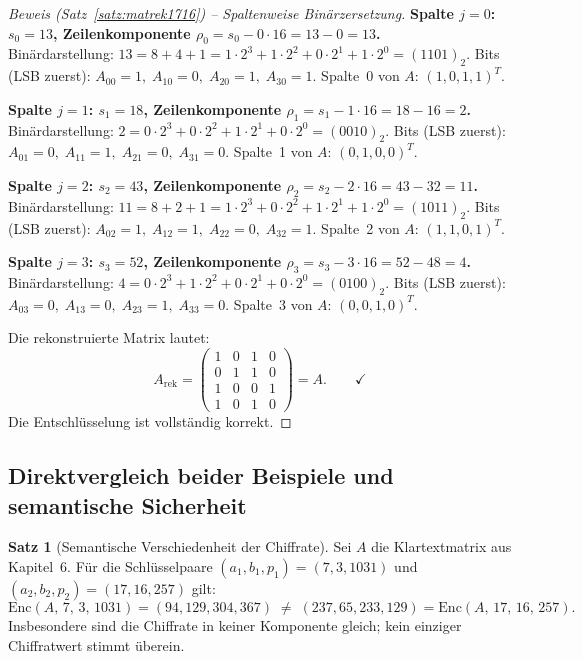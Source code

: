 ﻿\documentclass[a4paper,12pt]{scrreprt}
\theoremstyle{definition}
\newtheorem{satz}{Satz}[section]
\begin{document}
\begin{proof}[Beweis (Satz~\ref{satz:matrek1716}) -- Spaltenweise Binärzersetzung]

\medskip\noindent\textbf{Spalte $j=0$: $s_0 = 13$, Zeilenkomponente $\rho_0 = s_0 - 0 \cdot 16 = 13 - 0 = 13$.}\\
Binärdarstellung: $13 = 8 + 4 + 1 = 1 \cdot 2^3 + 1 \cdot 2^2 + 0 \cdot 2^1 + 1 \cdot 2^0 = (1101)_2$.
Bits (LSB zuerst): $A_{00}=1,\; A_{10}=0,\; A_{20}=1,\; A_{30}=1$.
Spalte~0 von $A$: $(1,0,1,1)^T$. \checkmark

\medskip\noindent\textbf{Spalte $j=1$: $s_1 = 18$, Zeilenkomponente $\rho_1 = s_1 - 1 \cdot 16 = 18 - 16 = 2$.}\\
Binärdarstellung: $2 = 0 \cdot 2^3 + 0 \cdot 2^2 + 1 \cdot 2^1 + 0 \cdot 2^0 = (0010)_2$.
Bits (LSB zuerst): $A_{01}=0,\; A_{11}=1,\; A_{21}=0,\; A_{31}=0$.
Spalte~1 von $A$: $(0,1,0,0)^T$. \checkmark

\medskip\noindent\textbf{Spalte $j=2$: $s_2 = 43$, Zeilenkomponente $\rho_2 = s_2 - 2 \cdot 16 = 43 - 32 = 11$.}\\
Binärdarstellung: $11 = 8 + 2 + 1 = 1 \cdot 2^3 + 0 \cdot 2^2 + 1 \cdot 2^1 + 1 \cdot 2^0 = (1011)_2$.
Bits (LSB zuerst): $A_{02}=1,\; A_{12}=1,\; A_{22}=0,\; A_{32}=1$.
Spalte~2 von $A$: $(1,1,0,1)^T$. \checkmark

\medskip\noindent\textbf{Spalte $j=3$: $s_3 = 52$, Zeilenkomponente $\rho_3 = s_3 - 3 \cdot 16 = 52 - 48 = 4$.}\\
Binärdarstellung: $4 = 0 \cdot 2^3 + 1 \cdot 2^2 + 0 \cdot 2^1 + 0 \cdot 2^0 = (0100)_2$.
Bits (LSB zuerst): $A_{03}=0,\; A_{13}=0,\; A_{23}=1,\; A_{33}=0$.
Spalte~3 von $A$: $(0,0,1,0)^T$. \checkmark

Die rekonstruierte Matrix lautet:
\[
A_{\mathrm{rek}} = \begin{pmatrix} 1 & 0 & 1 & 0 \\ 0 & 1 & 1 & 0 \\ 1 & 0 & 0 & 1 \\ 1 & 0 & 1 & 0 \end{pmatrix} = A. \qquad \checkmark
\]
Die Entschlüsselung ist vollständig korrekt.
\end{proof}

\subsection{Direktvergleich beider Beispiele und semantische Sicherheit}

\begin{satz}[Semantische Verschiedenheit der Chiffrate]
\label{satz:semsec}
Sei $A$ die Klartextmatrix aus Kapitel~6. Für die Schlüsselpaare $(a_1, b_1, p_1) = (7, 3, 1031)$ und $(a_2, b_2, p_2) = (17, 16, 257)$ gilt:
\[
\mathrm{Enc}(A,\, 7,\, 3,\, 1031) = (94, 129, 304, 367) \;\neq\; (237, 65, 233, 129) = \mathrm{Enc}(A,\, 17,\, 16,\, 257).
\]
Insbesondere sind die Chiffrate in keiner Komponente gleich; kein einziger Chiffratwert stimmt überein.
\end{satz}
\end{document}
